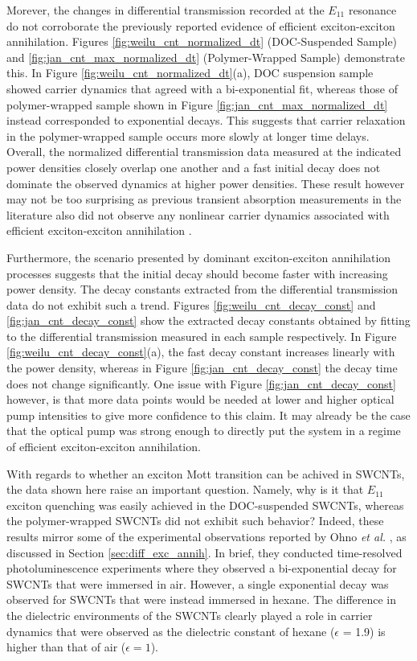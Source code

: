Morever, the changes in differential transmission recorded at the $E_{11}$ resonance do not corroborate the previously reported evidence of efficient exciton-exciton annihilation. Figures \ref{fig:weilu_cnt_normalized_dt} (DOC-Suspended Sample) and \ref{fig:jan_cnt_max_normalized_dt} (Polymer-Wrapped Sample) demonstrate this. In Figure \ref{fig:weilu_cnt_normalized_dt}(a), DOC suspension sample showed carrier dynamics that agreed with a bi-exponential fit, whereas those of polymer-wrapped sample shown in Figure \ref{fig:jan_cnt_max_normalized_dt} instead corresponded to exponential decays. This suggests that carrier relaxation in the polymer-wrapped sample occurs more slowly at longer time delays. Overall, the normalized differential transmission data measured at the indicated power densities closely overlap one another and a fast initial decay does not dominate the observed dynamics at higher power densities. These result however may not be too surprising as previous transient absorption measurements in the literature also did not observe any nonlinear carrier dynamics associated with efficient exciton-exciton annihilation \cite{ostojic2004interband, manzoni2005intersubband, ma2005femtosecond, luer2009size}.

Furthermore, the scenario presented by dominant exciton-exciton annihilation processes suggests that the initial decay should become faster with increasing power density. The decay constants extracted from the differential transmission data do not exhibit such a trend. Figures \ref{fig:weilu_cnt_decay_const} and \ref{fig:jan_cnt_decay_const} show the extracted decay constants obtained by fitting to the differential transmission measured in each sample respectively. In Figure \ref{fig:weilu_cnt_decay_const}(a), the fast decay constant increases linearly with the power density, whereas in Figure \ref{fig:jan_cnt_decay_const} the decay time does not change significantly. One issue with Figure \ref{fig:jan_cnt_decay_const} however, is that more data points would be needed at lower and higher optical pump intensities to give more confidence to this claim. It may already be the case that the optical pump was strong enough to directly put the system in a regime of efficient exciton-exciton annihilation.

With regards to whether an exciton Mott transition can be achived in SWCNTs, the data shown here raise an important question. Namely, why is it that $E_{11}$ exciton quenching was easily achieved in the DOC-suspended SWCNTs, whereas the polymer-wrapped SWCNTs did not exhibit such behavior? Indeed, these results mirror some of the experimental observations reported by Ohno \textit{et al.} \cite{ohno2007excitonic}, as discussed in Section \ref{sec:diff_exc_annih}. In brief, they conducted time-resolved photoluminescence experiments where they observed a bi-exponential decay for SWCNTs that were immersed in air. However, a single exponential decay was observed for SWCNTs that were instead immersed in hexane. The difference in the dielectric environments of the SWCNTs clearly played a role in carrier dynamics that were observed as the dielectric constant of hexane ($\epsilon$ = 1.9) is higher than that of air ($\epsilon = 1$).

